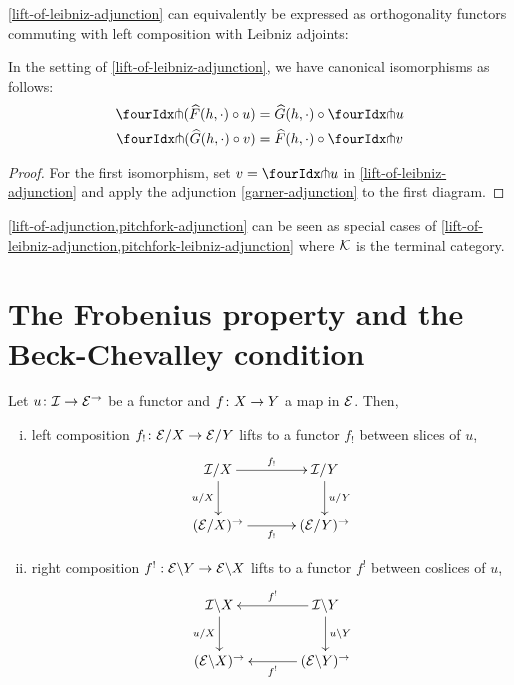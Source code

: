 \documentclass[reqno,10pt,a4paper,oneside]{amsart}
\begin{document}
\cref{lift-of-leibniz-adjunction} can equivalently be expressed as orthogonality functors commuting with left composition with Leibniz adjoints:

\begin{corollary}
\label{pitchfork-leibniz-adjunction}
In the setting of \cref{lift-of-leibniz-adjunction}, we have canonical isomorphisms as follows:
\begin{align*}
\liftr{(\widehat{F}(h, \arghole) \cc u)} &= \widehat{G}(h, \arghole) \cc \liftr{u}
\\
\liftl{(\widehat{G}(h, \arghole) \cc v)} &= \widehat{F}(h, \arghole) \cc \liftl{v}
\end{align*}
\end{corollary}

\begin{proof}
For \eg the first isomorphism, set $v = \liftr{u}$ in \cref{lift-of-leibniz-adjunction} and apply the adjunction \eqref{garner-adjunction} to the first diagram.
\end{proof}

\begin{remark}
\cref{lift-of-adjunction,pitchfork-adjunction} can be seen as special cases of \cref{lift-of-leibniz-adjunction,pitchfork-leibniz-adjunction} where $\cal{K}$ is the terminal category.
\end{remark}

\section{The Frobenius property and the Beck-Chevalley condition}
\label{sec:frobenius}

\begin{lemma}
\label{slicing-2-functorial}
Let $u \co \cal{I} \to \catE^{\to}$ be a functor and $f \co X \to Y$ a map in $\catE$. Then, 
\begin{enumerate}[(i)]
\item left composition $f_! \co \calE/X \to \calE/Y$ lifts to a functor $f_!$ between slices of $u$,
\[
\xymatrix@C+1em{
  \cal{I}/X
  \ar[r]^-{f_!}
  \ar[d]_{u/X}
&
  \cal{I}/Y
  \ar[d]^{u/Y}
\\
  (\calE/X)^{\to}
  \ar[r]_-{f_!}
&
  (\calE/Y)^{\to}
}
\]
\item right composition $f^! : \calE \backslash Y \to \calE \backslash X$ lifts to a functor $f^!$ between coslices of $u$,
\[
\xymatrix@C+1em{
  \cal{I} \backslash X
  \ar[d]_{u/X}
&
  \cal{I} \backslash Y
  \ar[l]_-{f^!}
  \ar[d]^{u \backslash Y}
\\
  (\calE \backslash X)^{\to}
&
  (\calE \backslash Y)^{\to}
  \ar[l]^-{f^!}
}
\]
\end{enumerate}
\end{lemma}
\end{document}
